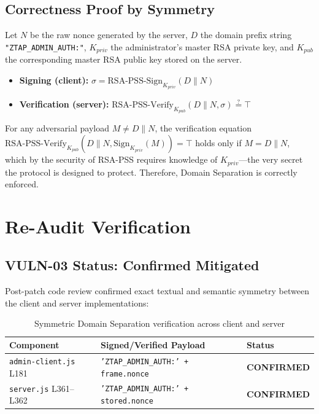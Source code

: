 \documentclass[12pt,a4paper]{article}
\begin{document}
\subsection{Correctness Proof by Symmetry}

Let $N$ be the raw nonce generated by the server, $D$ the domain prefix string \texttt{"ZTAP\_ADMIN\_AUTH:"}, $K_{priv}$ the administrator's master RSA private key, and $K_{pub}$ the corresponding master RSA public key stored on the server.

\begin{itemize}
    \item \textbf{Signing (client):} $\sigma = \text{RSA-PSS-Sign}_{K_{priv}}(D \| N)$
    \item \textbf{Verification (server):} $\text{RSA-PSS-Verify}_{K_{pub}}(D \| N, \sigma) \stackrel{?}{=} \top$
\end{itemize}

For any adversarial payload $M \neq D \| N$, the verification equation $\text{RSA-PSS-Verify}_{K_{pub}}(D \| N, \text{Sign}_{K_{priv}}(M)) = \top$ holds only if $M = D \| N$, which by the security of RSA-PSS requires knowledge of $K_{priv}$---the very secret the protocol is designed to protect. Therefore, Domain Separation is correctly enforced.

\section{Re-Audit Verification}

\subsection{VULN-03 Status: Confirmed Mitigated}

Post-patch code review confirmed exact textual and semantic symmetry between the client and server implementations:

\begin{table}[h!]
\centering
\begin{tabularx}{\textwidth}{lXl}
\toprule
\textbf{Component} & \textbf{Signed/Verified Payload} & \textbf{Status} \\
\midrule
\texttt{admin-client.js} L181 & \texttt{'ZTAP\_ADMIN\_AUTH:' + frame.nonce} & \textcolor{safegreen}{\textbf{CONFIRMED}} \\
\texttt{server.js} L361--L362 & \texttt{'ZTAP\_ADMIN\_AUTH:' + stored.nonce} & \textcolor{safegreen}{\textbf{CONFIRMED}} \\
\bottomrule
\end{tabularx}
\caption{Symmetric Domain Separation verification across client and server}
\end{table}
\end{document}
